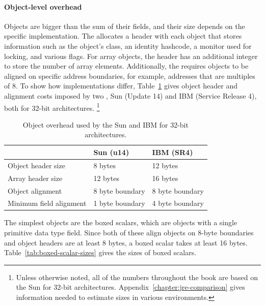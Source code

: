 \paragraph{Object-level overhead} Objects are bigger than the sum of their
fields, and their size depends on the specific \jre implementation. The \jre allocates a header with each object that
stores information such as the object's class, an identity hashcode, a monitor
used for locking, and various flags. For array objects, the header has an
additional integer to store the number of array elements. Additionally,  the
\jre requires objects to be aligned on specific address boundaries, for example,
addresses that are multiples of 8. To show how implementations differ,
Table~\ref{tab:object-overhead} gives object header and alignment costs imposed
by two \jres, Sun \javasix (Update 14) and IBM \javasix (Service Release 4),
both for 32-bit architectures. \footnote{Unless otherwise noted, all of the
numbers throughout the book are based on the Sun \jre for 32-bit architectures.
Appendix~\ref{chapter:jre-comparison} gives information needed to estimate
sizes in various environments.}
\begin{table}
  \centering
 \begin{tabular}{lll} \toprule
 	& Sun \javasix (u14) & IBM \javasix (SR4) \\ \midrule
 	Object header size & 8 bytes & 12 bytes \\
 	Array header size & 12 bytes & 16 bytes \\
 	Object alignment & 8 byte boundary & 8 byte boundary \\
 	Minimum field alignment & 1 byte boundary & 4 byte boundary \\
 	\bottomrule
 \end{tabular}
  \caption{Object overhead used by the Sun and IBM \jres for 32-bit architectures.}
  \label{tab:object-overhead}
\end{table} 
   
The simplest objects are the boxed scalars, which are objects with a single
primitive data type field. Since both of these \jres align objects on
8-byte boundaries and object headers are at least 8 bytes, a boxed scalar takes
at least 16 bytes. Table~\ref{tab:boxed-scalar-sizes} gives the sizes of boxed
scalars.

